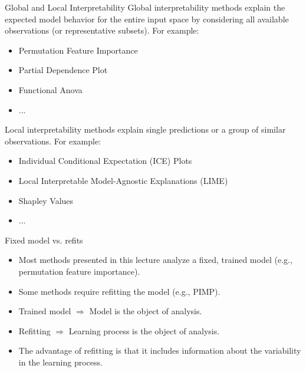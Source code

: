 \documentclass[11pt,compress,t,notes=noshow, xcolor=table]{beamer}
\begin{document}
\begin{vbframe}{Global and Local Interpretability}
Global interpretability methods explain the expected model behavior for the entire input space by considering all available observations (or representative subsets). For example:
  \begin{itemize}
    \item Permutation Feature Importance
    \item Partial Dependence Plot
    \item Functional Anova
    \item ...
  \end{itemize}
\lz
Local interpretability methods explain single predictions or a group of similar observations. For example:
 \begin{itemize}
  \item Individual Conditional Expectation (ICE) Plots
  \item Local Interpretable Model-Agnostic Explanations (LIME)
  \item Shapley Values
  \item ...
 \end{itemize}
\end{vbframe}


\begin{vbframe}{Fixed model vs. refits}
  \begin{itemize}
     \itemsep2em
     \item Most methods presented in this lecture analyze a fixed, trained model 
     (e.g., permutation feature importance).
     \item Some methods require refitting the model (e.g., PIMP).
     \item Trained model $\Rightarrow$ Model is the object of analysis.
     \item Refitting $\Rightarrow$ Learning process is the object of analysis.
     \item The advantage of refitting is that it includes information about the variability in the learning process.
  \end{itemize}
\end{vbframe}
\end{document}
